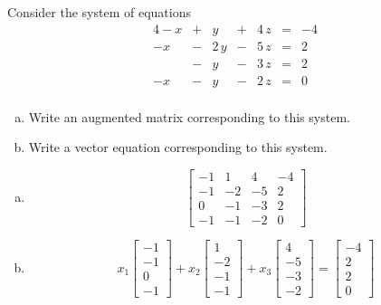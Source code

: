 
\begin{exerciseStatement}


 Consider the system of equations 
\begin{alignat*}{4} -x &+& y &+& 4 \, z &=& -4 \\-x &-& 2 \, y &-& 5 \, z &=& 2 \\ &-& y &-& 3 \, z &=& 2 \\-x &-& y &-& 2 \, z &=& 0 \\ \end{alignat*}
            


\begin{enumerate}[(a)]
\item  Write an augmented matrix corresponding to this system. 
\item  Write a vector equation corresponding to this system. 
\end{enumerate}
    
\end{exerciseStatement}
    
\begin{exerciseAnswer} 

\begin{enumerate}[(a)]
\item \[ \left[\begin{array}{ccc|c}
-1 & 1 & 4 & -4 \\
-1 & -2 & -5 & 2 \\
0 & -1 & -3 & 2 \\
-1 & -1 & -2 & 0
\end{array}\right] \]
\item \[ x_{1} \left[\begin{array}{c}
-1 \\
-1 \\
0 \\
-1
\end{array}\right] + x_{2} \left[\begin{array}{c}
1 \\
-2 \\
-1 \\
-1
\end{array}\right] + x_{3} \left[\begin{array}{c}
4 \\
-5 \\
-3 \\
-2
\end{array}\right] = \left[\begin{array}{c}
-4 \\
2 \\
2 \\
0
\end{array}\right] \]
\end{enumerate}
    
\end{exerciseAnswer}
    
